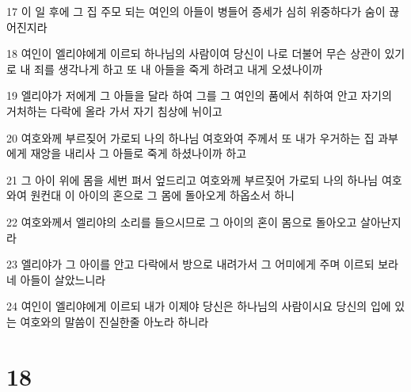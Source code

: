 \par 17 이 일 후에 그 집 주모 되는 여인의 아들이 병들어 증세가 심히 위중하다가 숨이 끊어진지라
\par 18 여인이 엘리야에게 이르되 하나님의 사람이여 당신이 나로 더불어 무슨 상관이 있기로 내 죄를 생각나게 하고 또 내 아들을 죽게 하려고 내게 오셨나이까
\par 19 엘리야가 저에게 그 아들을 달라 하여 그를 그 여인의 품에서 취하여 안고 자기의 거처하는 다락에 올라 가서 자기 침상에 뉘이고
\par 20 여호와께 부르짖어 가로되 나의 하나님 여호와여 주께서 또 내가 우거하는 집 과부에게 재앙을 내리사 그 아들로 죽게 하셨나이까 하고
\par 21 그 아이 위에 몸을 세번 펴서 엎드리고 여호와께 부르짖어 가로되 나의 하나님 여호와여 원컨대 이 아이의 혼으로 그 몸에 돌아오게 하옵소서 하니
\par 22 여호와께서 엘리야의 소리를 들으시므로 그 아이의 혼이 몸으로 돌아오고 살아난지라
\par 23 엘리야가 그 아이를 안고 다락에서 방으로 내려가서 그 어미에게 주며 이르되 보라 네 아들이 살았느니라
\par 24 여인이 엘리야에게 이르되 내가 이제야 당신은 하나님의 사람이시요 당신의 입에 있는 여호와의 말씀이 진실한줄 아노라 하니라

\chapter{18}

